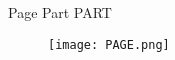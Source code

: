 \hspace{-2em}
Page \thepage \hfill Part PART
\vspace{-2.5em}
\begin{figure}[H]
\centering
\texttt{[image: PAGE.png]}
\end{figure}
\newpage

